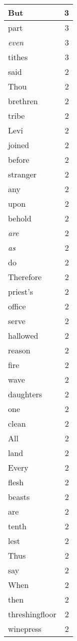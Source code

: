 \begin{center}
\begin{longtable}{l|r}
But & 3 \\ \hline
part & 3 \\ \hline
\emph{even} & 3 \\ \hline
tithes & 3 \\ \hline
said & 2 \\ \hline
Thou & 2 \\ \hline
brethren & 2 \\ \hline
tribe & 2 \\ \hline
Levi & 2 \\ \hline
joined & 2 \\ \hline
before & 2 \\ \hline
stranger & 2 \\ \hline
any & 2 \\ \hline
upon & 2 \\ \hline
behold & 2 \\ \hline
\emph{are} & 2 \\ \hline
\emph{as} & 2 \\ \hline
do & 2 \\ \hline
Therefore & 2 \\ \hline
priest's & 2 \\ \hline
office & 2 \\ \hline
serve & 2 \\ \hline
hallowed & 2 \\ \hline
reason & 2 \\ \hline
fire & 2 \\ \hline
wave & 2 \\ \hline
daughters & 2 \\ \hline
one & 2 \\ \hline
clean & 2 \\ \hline
All & 2 \\ \hline
land & 2 \\ \hline
Every & 2 \\ \hline
flesh & 2 \\ \hline
beasts & 2 \\ \hline
are & 2 \\ \hline
tenth & 2 \\ \hline
lest & 2 \\ \hline
Thus & 2 \\ \hline
say & 2 \\ \hline
When & 2 \\ \hline
then & 2 \\ \hline
threshingfloor & 2 \\ \hline
winepress & 2 \\ \hline

\end{longtable}
\end{center}

